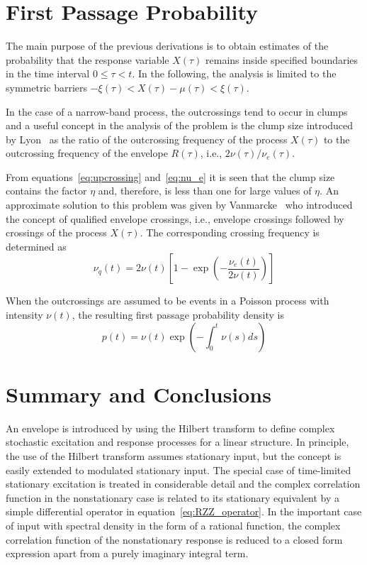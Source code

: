 \documentclass[12pt]{article}
\begin{document}
\section{First Passage Probability}

The main purpose of the previous derivations is to obtain estimates of the probability that the response variable $X(\tau)$ remains inside specified boundaries in the time interval $0 \leq \tau < t$. In the following, the analysis is limited to the symmetric barriers $-\xi(\tau) < X(\tau) - \mu(\tau) < \xi(\tau)$.

In the case of a narrow-band process, the outcrossings tend to occur in clumps and a useful concept in the analysis of the problem is the clump size introduced by Lyon~\cite{lyon1961} as the ratio of the outcrossing frequency of the process $X(\tau)$ to the outcrossing frequency of the envelope $R(\tau)$, i.e., $2\nu(\tau)/\nu_e(\tau)$.

From equations~\eqref{eq:upcrossing} and~\eqref{eq:nu_e} it is seen that the clump size contains the factor $\eta$ and, therefore, is less than one for large values of $\eta$. An approximate solution to this problem was given by Vanmarcke~\cite{vanmarcke1975} who introduced the concept of qualified envelope crossings, i.e., envelope crossings followed by crossings of the process $X(\tau)$. The corresponding crossing frequency is determined as
\begin{equation}
    \nu_q(t) = 2\nu(t) \left[ 1 - \exp\left( -\frac{\nu_e(t)}{2\nu(t)} \right) \right]
    \label{eq:nu_q}
\end{equation}

When the outcrossings are assumed to be events in a Poisson process with intensity $\nu(t)$, the resulting first passage probability density is
\begin{equation}
    p(t) = \nu(t) \exp\left( -\int_0^t \nu(s) ds \right)
    \label{eq:first_passage}
\end{equation}

\section{Summary and Conclusions}

An envelope is introduced by using the Hilbert transform to define complex stochastic excitation and response processes for a linear structure. In principle, the use of the Hilbert transform assumes stationary input, but the concept is easily extended to modulated stationary input. The special case of time-limited stationary excitation is treated in considerable detail and the complex correlation function in the nonstationary case is related to its stationary equivalent by a simple differential operator in equation~\eqref{eq:RZZ_operator}. In the important case of input with spectral density in the form of a rational function, the complex correlation function of the nonstationary response is reduced to a closed form expression apart from a purely imaginary integral term.
\end{document}
